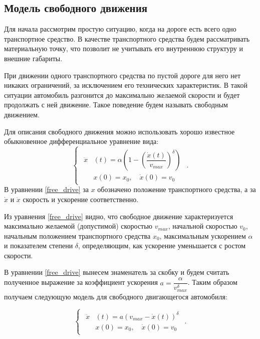 \documentclass[12pt, a4paper]{extarticle}
\numberwithin{equation}{section}
\numberwithin{figure}{section}
\begin{document}
\subsection{Модель свободного движения}

Для начала рассмотрим простую ситуацию, когда на дороге есть всего одно транспортное средство. В качестве транспортного средства будем рассматривать материальную точку, что позволит не учитывать его внутреннюю структуру и внешние габариты. 

При движении одного транспортного средства по пустой дороге для него нет никаких ограничений, за исключением его технических характеристик. В такой ситуации автомобиль разгонится до максимально желаемой скорости и будет продолжать с ней движение. Такое поведение будем называть свободным движением. 

Для описания свободного движения можно использовать хорошо известное обыкновенное дифференциальное уравнение вида: 
\begin{equation} \label{free_drive}
\begin{cases}
\begin{split}
\ddot{x}&(t) = \alpha\left( 1-\left( \dfrac{\dot{x}(t)}{v_{max}}\right)^\delta \right) \\
&x(0)=x_0, \quad \dot{x}(0)=v_{0}
\end{split}
\end{cases}.
\end{equation}
В уравнении \eqref{free_drive} за $x$ обозначено положение транспортного средства, а за $\dot{x}$ и $\ddot{x}$ скорость и ускорение соответственно.

Из уравнения \eqref{free_drive} видно, что свободное движение характеризуется максимально желаемой (допустимой) скоростью $v_{max}$, начальной скоростью $v_{0}$, начальным положением транспортного средства $x_0$, максимальным ускорением $\alpha$ и показателем степени $\delta$, определяющим, как ускорение уменьшается с ростом скорости.

В уравнении \eqref{free_drive} вынесем знаменатель за скобку и будем считать полученное выражение за коэффициент ускорения $a=\dfrac{\alpha}{v_{max}^\delta}$. Таким образом получаем следующую модель для свободного двигающегося автомобиля:

\begin{equation} \label{free_drive_with_initial_conditions}
\begin{cases}
\begin{split}
\ddot{x}&(t) = a\left( v_{max} - \dot{x}(t)\right)^\delta \\
&x(0)=x_0, \quad \dot{x}(0)=v_0
\end{split}
\end{cases}.
\end{equation}
\end{document}
